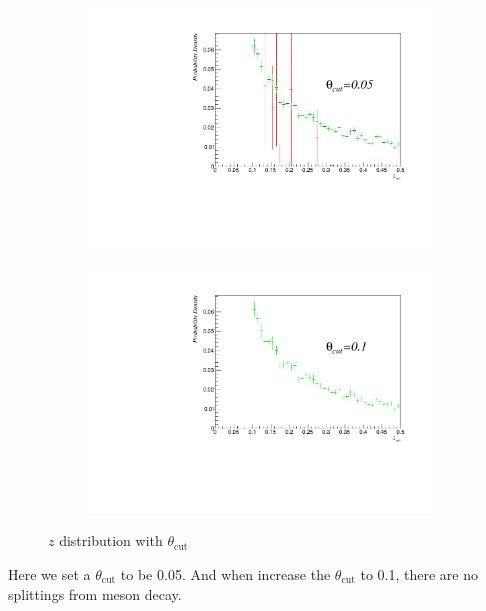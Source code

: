 \documentclass[9pt, mathserif]{beamer}
\begin{document}
        \begin{frame}
            \begin{figure}[t]
                \centering
                \begin{subfigure}{0.47\linewidth}
                    \centering
                    \includegraphics[width=\linewidth]{2.pdf}
                    \caption{}
                \end{subfigure}
                \begin{subfigure}{0.47\textwidth}
                    \centering
                    \includegraphics[width=\linewidth]{3.pdf}
                    \caption{}
                \end{subfigure}
                \caption{$z$ distribution with $\theta_{\mathrm{cut}}$}
            \end{figure}
            Here we set a $\theta_{\mathrm{cut}}$ to be 0.05. And when increase the $\theta_{\mathrm{cut}}$ to 0.1,
		    there are no splittings from meson decay.
        \end{frame}
\end{document}
